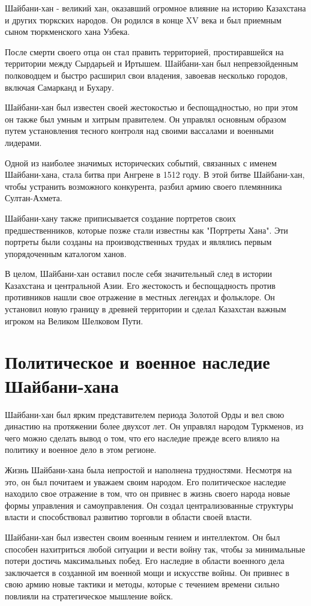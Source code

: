 \documentclass[draft]{article}
\begin{document}
Шайбани-хан - великий хан, оказавший огромное влияние на историю Казахстана и других тюркских народов. Он родился в конце XV века и был приемным сыном тюркменского хана Узбека.

После смерти своего отца он стал править территорией, простиравшейся на территории между Сырдарьей и Иртышем. Шайбани-хан был непревзойденным полководцем и быстро расширил свои владения, завоевав несколько городов, включая Самарканд и Бухару.

Шайбани-хан был известен своей жестокостью и беспощадностью, но при этом он также был умным и хитрым правителем. Он управлял основным образом путем установления тесного контроля над своими вассалами и военными лидерами.

Одной из наиболее значимых исторических событий, связанных с именем Шайбани-хана, стала битва при Ангрене в 1512 году. В этой битве Шайбани-хан, чтобы устранить возможного конкурента, разбил армию своего племянника Султан-Ахмета.

Шайбани-хану также приписывается создание портретов своих предшественников, которые позже стали известны как "Портреты Хана". Эти портреты были созданы на производственных трудах и являлись первым упорядоченным каталогом ханов.

В целом, Шайбани-хан оставил после себя значительный след в истории Казахстана и центральной Азии. Его жестокость и беспощадность против противников нашли свое отражение в местных легендах и фольклоре. Он установил новую границу в древней территории и сделал Казахстан важным игроком на Великом Шелковом Пути.\newpage\section{Политическое и военное наследие Шайбани-хана}

Шайбани-хан был ярким представителем периода Золотой Орды и вел свою династию на протяжении более двухсот лет. Он управлял народом Туркменов, из чего можно сделать вывод о том, что его наследие прежде всего влияло на политику и военное дело в этом регионе.

Жизнь Шайбани-хана была непростой и наполнена трудностями. Несмотря на это, он был почитаем и уважаем своим народом. Его политическое наследие находило свое отражение в том, что он привнес в жизнь своего народа новые формы управления и самоуправления. Он создал централизованные структуры власти и способствовал развитию торговли в области своей власти.

Шайбани-хан был известен своим военным гением и интеллектом. Он был способен нахитриться любой ситуации и вести войну так, чтобы за минимальные потери достичь максимальных побед. Его наследие в области военного дела заключается в созданной им военной мощи и искусстве войны. Он привнес в свою армию новые тактики и методы, которые с течением времени сильно повлияли на стратегическое мышление войск.
\end{document}
